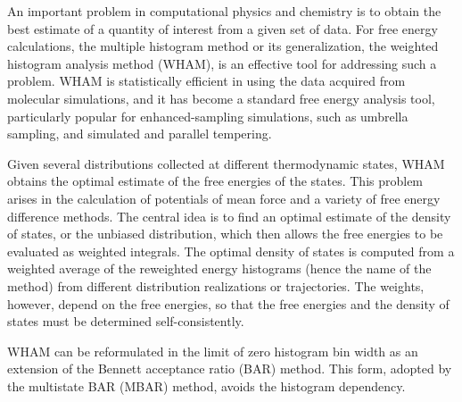 \documentclass[reprint,aip,jcp,superscriptaddress]{revtex4-1}
\begin{document}
An important problem in computational physics and chemistry
is to obtain the best estimate of a quantity of interest
from a given set of data\cite{
shirts2008}.
%
For free energy calculations,
the multiple histogram method\cite{
ferrenberg1988, *ferrenberg1989,
newman, frenkel}
or its generalization,
the weighted histogram analysis method (WHAM)\cite{
kumar1992, roux1995,
bartels1997, *gallicchio2005, *habeck2007, *habeck2012,
souaille2001,
chodera2007, shirts2008, bereau2009,
hub2010, zhu2012},
is an effective tool for
addressing such a problem.
%
WHAM is statistically efficient in using the data
acquired from molecular simulations,
and it has become
a standard free energy analysis tool,
particularly popular
for enhanced-sampling simulations,
such as umbrella sampling\cite{
torrie1974, *laio2002},
and simulated\cite{
marinari1992, *lyubartsev1992}
and parallel\cite{
swendsen1986, *geyer1991, *hukushima1996, *hansmann1997, *earl2005}
tempering.




Given several distributions collected
at different thermodynamic states,
WHAM obtains the optimal estimate
of the free energies of the states.
%
This problem arises in the calculation of potentials of mean force and a variety of free energy difference methods.
%
The central idea is to find an optimal estimate
of the density of states,
or the unbiased distribution,
which then allows
the free energies to be evaluated
as weighted integrals.
%
The optimal density of states
is computed from a weighted average
of the reweighted energy histograms
(hence the name of the method)
from different distribution realizations or trajectories.
%
The weights, however,
depend on the free energies,
so that
the free energies
and the density of states
must be determined self-consistently.



WHAM can be reformulated in the limit of
{
zero histogram bin width\cite{
shirts2008}
}
as an extension
of the Bennett acceptance ratio (BAR) method\cite{
bennett1976}.
%
%
This form,
adopted by the multistate BAR (MBAR) method\cite{
shirts2008},
avoids the histogram dependency\cite{
kumar1992, souaille2001, shirts2008}.
\end{document}
